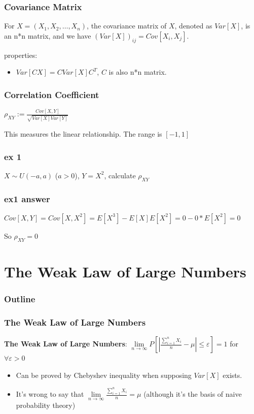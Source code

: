 \documentclass{beamer}
\begin{document}
\begin{frame}
    \frametitle{Covariance Matrix}

    For $X=(X_1,X_2,\dots , X_n)$, the covariance matrix of $X$, denoted as $Var[X]$, is an n*n matrix, and we have $(Var[X])_{ij}=Cov[X_i,X_j]$.\par
    properties: 
    \begin{itemize}
        \item $Var[CX]=C Var[X] C^{T}$, $C$ is also n*n matrix.
    \end{itemize}

\end{frame}

\begin{frame}
    \frametitle{Correlation Coefficient}

    $\rho_{XY}:=\frac{Cov[X,Y]}{\sqrt{Var[X]Var[Y]}}$\par
    This measures the linear relationship. The range is $[-1,1]$

\end{frame}

\begin{frame}
    \frametitle{ex 1}

    $X\sim U(-a,a)$ ($a>0$), $Y=X^2$, calculate $\rho_{XY}$

\end{frame}

\begin{frame}
    \frametitle{ex1 answer}

    $Cov[X,Y]=Cov[X,X^2]=E[X^3]-E[X]E[X^2]=0-0*E[X^2]=0$\par
    So $\rho_{XY}=0$

\end{frame}
\section{The Weak Law of Large Numbers}

\begin{frame}
    \frametitle{Outline}
    \tableofcontents[currentsection]
\end{frame}

\begin{frame}
    \frametitle{The Weak Law of Large Numbers}
    \textbf{The Weak Law of Large Numbers}: $\lim\limits_{n\rightarrow\infty}P[|\frac{\sum\limits_{i=1}^{n}X_i}{n}-\mu|\leq\varepsilon]=1$ for $\forall \varepsilon>0$\par
    \begin{itemize}
        \item Can be proved by Chebyshev inequality when supposing $Var[X]$ exists.
        \item It's wrong to say that $\lim\limits_{n\rightarrow\infty}\frac{\sum\limits_{i=1}^{n}X_i}{n}=\mu$ (although it's the basis of naive probability theory)
    \end{itemize}

\end{frame}
\end{document}
